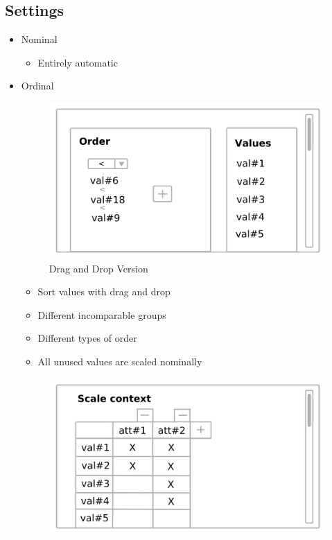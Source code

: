 \documentclass[]{report}
\begin{document}
\newpage
\subsection{Settings}
\begin{itemize}
	\item Nominal
		\begin{itemize}
		\item Entirely automatic
		\end{itemize}	    
	\item Ordinal
		\begin{figure}[H]
			\includegraphics[width=\linewidth]{mock_up/ord-2.png}
			\caption{Drag and Drop Version}
			\label{fig:o1}
		\end{figure}
		\begin{itemize}
			\item Sort values with drag and drop
			\item Different incomparable groups
			\item Different types of order
			\item All unused values are scaled nominally 
		\end{itemize}
		\begin{figure}[H]
			\includegraphics[width=\linewidth]{mock_up/ord-1.png}

\end{figure}
\end{itemize}
\end{document}
